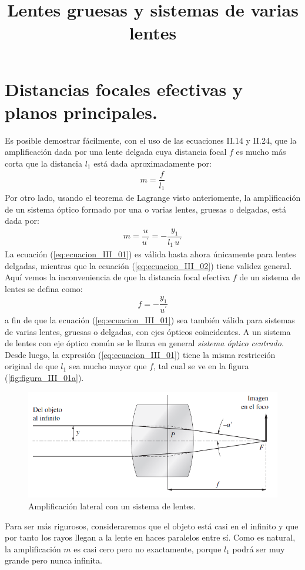 \documentclass[14pt]{extarticle}
\title{\vspace*{-2cm} Lentes gruesas y sistemas de varias lentes}
\date{ }
\begin{document}
\maketitle

\section{Distancias focales efectivas y planos principales.}

Es posible demostrar fácilmente, con el uso de las ecuaciones II.14 y II.24, que la amplificación dada por una lente delgada cuya distancia focal $f$ es mucho más corta que la distancia $l_{1}$ está dada aproximadamente por:
\begin{align}
m = \dfrac{f}{l_{1}}
\label{eq:ecuacion_III_01}
\end{align}
Por otro lado, usando el teorema de Lagrange visto anteriomente, la amplificación
de un sistema óptico formado por una o varias lentes, gruesas o delgadas, está dada por:
\begin{align}
m = \dfrac{u}{u^{\prime}} = - \dfrac{y_{1}}{l_{1} \, u^{\prime}}
\label{eq:ecuacion_III_02}
\end{align}
La ecuación (\ref{eq:ecuacion_III_01}) es válida hasta ahora únicamente para lentes delgadas, mientras que la ecuación (\ref{eq:ecuacion_III_02}) tiene validez general. Aquí vemos la inconveniencia de que la distancia focal efectiva $f$ de un sistema de lentes se defina como:
\begin{align}
f = - \dfrac{y_{1}}{u^{\prime}}
\label{eq:ecuacion_III_03}
\end{align}
a fin de que la ecuación (\ref{eq:ecuacion_III_01}) sea también válida para sistemas de varias lentes, gruesas o delgadas, con ejes ópticos coincidentes. A un sistema de lentes con eje óptico común se le llama en general \textit{sistema óptico centrado}. Desde luego, la expresión (\ref{eq:ecuacion_III_01}) tiene la misma restricción original de que $l_{1}$ sea mucho mayor que $f$, tal cual se ve en la figura (\ref{fig:figura_III_01a}).
\begin{figure}[H]
    \centering
    \includegraphics[scale=0.7]{Imagenes/Lentes_Gruesas_01.png}
    \caption{Amplificación lateral con un sistema de lentes.}
    \label{fig:figura_III_01}
\end{figure}
Para ser más rigurosos, consideraremos que el objeto está casi en el infinito y que por tanto los rayos llegan a la lente en haces paralelos entre sí. Como es natural, la amplificación $m$ es casi cero pero no exactamente, porque $l_{1}$ podrá ser muy grande pero nunca infinita.
\end{document}
